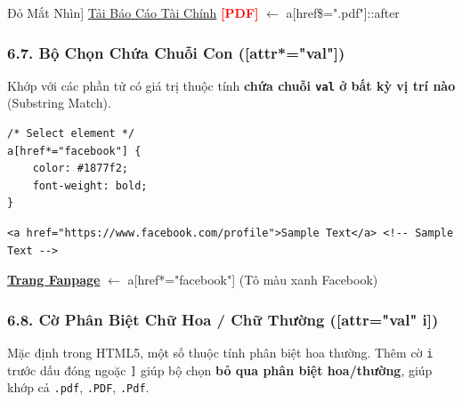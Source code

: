 \documentclass[11pt,oneside]{book}
\newcommand{\codeinline}[1]{\textcolor{accentOrange}{\texttt{#1}}}
\begin{document}
\begin{browserWindow}[Kết Quả Hiển Thị: Tự Động Chèn Nhãn [PDF] Đỏ Mắt Nhìn]
\sffamily\small
\textcolor{primaryBlue}{\underline{Tải Báo Cáo Tài Chính}} \textcolor{red}{\textbf{[PDF]}} \textcolor{gray!60}{\scriptsize $\leftarrow$ a[href\$=".pdf"]::after}
\end{browserWindow}

\subsubsection{6.7. Bộ Chọn Chứa Chuỗi Con ([attr*="val"])}

\begin{conceptBox}
Khớp với các phần tử có giá trị thuộc tính \textbf{chứa chuỗi \codeinline{val} ở bất kỳ vị trí nào} (Substring Match).
\end{conceptBox}

\begin{codeWindow}
\begin{lstlisting}[language=CSS3]
/* Select element */
a[href*="facebook"] {
    color: #1877f2;
    font-weight: bold;
}
\end{lstlisting}

\begin{lstlisting}[language=HTML5]
<a href="https://www.facebook.com/profile">Sample Text</a> <!-- Sample Text -->
\end{lstlisting}
\end{codeWindow}

\begin{browserWindow}
\sffamily\small
\textcolor{primaryBlue}{\textbf{\underline{Trang Fanpage}}} \textcolor{gray!60}{\scriptsize $\leftarrow$ a[href*="facebook"] (Tô màu xanh Facebook)}
\end{browserWindow}

\subsubsection{6.8. Cờ Phân Biệt Chữ Hoa / Chữ Thường ([attr="val" i])}

\begin{conceptBox}
Mặc định trong HTML5, một số thuộc tính phân biệt hoa thường. Thêm cờ \codeinline{i} trước dấu đóng ngoặc \codeinline{]} giúp bộ chọn \textbf{bỏ qua phân biệt hoa/thường}, giúp khớp cả \codeinline{.pdf}, \codeinline{.PDF}, \codeinline{.Pdf}.
\end{conceptBox}
\end{document}
